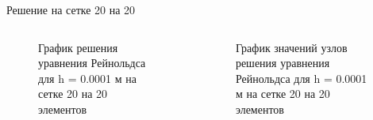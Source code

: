 \documentclass[ignoreonframetext,unicode]{beamer}
\begin{document}
\begin{frame}{Решение на сетке 20 на 20}
	
	\begin{columns}
		
		\begin{figure}[!htbp]
			\caption{График решения уравнения Рейнольдса для h = 0.0001 м на сетке 20 на 20 элементов}
			\label{5x5mesh}
		\end{figure}
		
		\begin{figure}[!htbp]
			\caption{График значений узлов решения уравнения Рейнольдса для h = 0.0001 м на сетке 20 на 20 элементов}
			\label{20x20points}
		\end{figure}
		
	\end{columns}
	
\end{frame}
\end{document}
